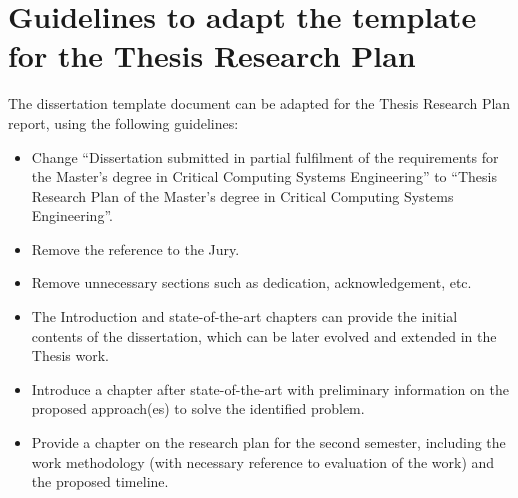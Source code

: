 
\chapter{Guidelines to adapt the template for the Thesis Research Plan} %

\label{AppendixA} %

The dissertation template document can be adapted for the Thesis Research Plan report, using the following guidelines:
\begin{itemize}
\item Change “Dissertation submitted in partial fulfilment of the requirements for the Master’s degree in Critical Computing Systems Engineering” to “Thesis Research Plan of the Master’s degree in Critical Computing Systems Engineering”.
\item	Remove the reference to the Jury.
\item	Remove unnecessary sections such as dedication, acknowledgement, etc.
\item	The Introduction and state-of-the-art chapters can provide the initial contents of the dissertation, which can be later evolved and extended in the Thesis work.
\item	Introduce a chapter after state-of-the-art with preliminary information on the proposed approach(es) to solve the identified problem. 
\item	Provide a chapter on the research plan for the second semester, including the work methodology (with necessary reference to evaluation of the work) and the proposed timeline.
\end{itemize}
